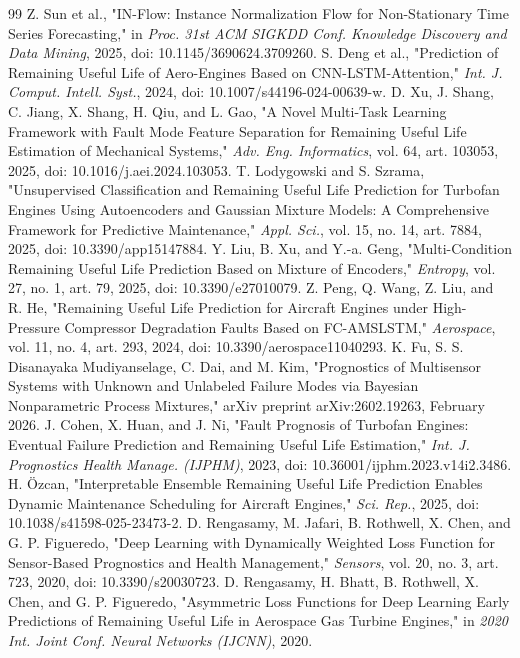 \documentclass[preprint,10pt]{elsarticle}
\begin{document}
\begin{thebibliography}{99}
  Z. Sun et al., "IN-Flow: Instance Normalization Flow for Non-Stationary Time Series Forecasting," in \textit{Proc. 31st ACM SIGKDD Conf. Knowledge Discovery and Data Mining}, 2025, doi: 10.1145/3690624.3709260.
  S. Deng et al., "Prediction of Remaining Useful Life of Aero-Engines Based on CNN-LSTM-Attention," \textit{Int. J. Comput. Intell. Syst.}, 2024, doi: 10.1007/s44196-024-00639-w.
  D. Xu, J. Shang, C. Jiang, X. Shang, H. Qiu, and L. Gao, "A Novel Multi-Task Learning Framework with Fault Mode Feature Separation for Remaining Useful Life Estimation of Mechanical Systems," \textit{Adv. Eng. Informatics}, vol. 64, art. 103053, 2025, doi: 10.1016/j.aei.2024.103053.
  T. Lodygowski and S. Szrama, "Unsupervised Classification and Remaining Useful Life Prediction for Turbofan Engines Using Autoencoders and Gaussian Mixture Models: A Comprehensive Framework for Predictive Maintenance," \textit{Appl. Sci.}, vol. 15, no. 14, art. 7884, 2025, doi: 10.3390/app15147884.
  Y. Liu, B. Xu, and Y.-a. Geng, "Multi-Condition Remaining Useful Life Prediction Based on Mixture of Encoders," \textit{Entropy}, vol. 27, no. 1, art. 79, 2025, doi: 10.3390/e27010079.
  Z. Peng, Q. Wang, Z. Liu, and R. He, "Remaining Useful Life Prediction for Aircraft Engines under High-Pressure Compressor Degradation Faults Based on FC-AMSLSTM," \textit{Aerospace}, vol. 11, no. 4, art. 293, 2024, doi: 10.3390/aerospace11040293.
  K. Fu, S. S. Disanayaka Mudiyanselage, C. Dai, and M. Kim, "Prognostics of Multisensor Systems with Unknown and Unlabeled Failure Modes via Bayesian Nonparametric Process Mixtures," arXiv preprint arXiv:2602.19263, February 2026.
  J. Cohen, X. Huan, and J. Ni, "Fault Prognosis of Turbofan Engines: Eventual Failure Prediction and Remaining Useful Life Estimation," \textit{Int. J. Prognostics Health Manage. (IJPHM)}, 2023, doi: 10.36001/ijphm.2023.v14i2.3486.
  H. \"{O}zcan, "Interpretable Ensemble Remaining Useful Life Prediction Enables Dynamic Maintenance Scheduling for Aircraft Engines," \textit{Sci. Rep.}, 2025, doi: 10.1038/s41598-025-23473-2.
  D. Rengasamy, M. Jafari, B. Rothwell, X. Chen, and G. P. Figueredo, "Deep Learning with Dynamically Weighted Loss Function for Sensor-Based Prognostics and Health Management," \textit{Sensors}, vol. 20, no. 3, art. 723, 2020, doi: 10.3390/s20030723.
  D. Rengasamy, H. Bhatt, B. Rothwell, X. Chen, and G. P. Figueredo, "Asymmetric Loss Functions for Deep Learning Early Predictions of Remaining Useful Life in Aerospace Gas Turbine Engines," in \textit{2020 Int. Joint Conf. Neural Networks (IJCNN)}, 2020.

\end{thebibliography}
\end{document}

